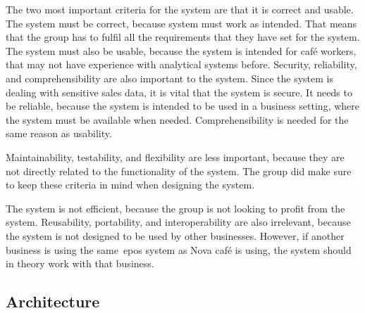 The two most important criteria for the system are that it is correct and usable.
The system must be correct, because system must work as intended.
That means that the group has to fulfil all the requirements that they have set for the system.
The system must also be usable, because the system is intended for café workers, that may not have experience with
analytical systems before.
Security, reliability, and comprehensibility are also important to the system.
Since the system is dealing with sensitive sales data, it is vital that the system is secure.
It needs to be reliable, because the system is intended to be used in a business setting, where the system must be 
available when needed.
Comprehensibility is needed for the same reason as usability.

Maintainability, testability, and flexibility are less important, because they are not directly related to the
functionality of the system.
The group did make sure to keep these criteria in mind when designing the system.

The system is not efficient, because the group is not looking to profit from the system.
Reusability, portability, and interoperability are also irrelevant, because the system is not designed to be used by
other businesses.
However, if another business is using the same~\acrshort{epos} system as Nova café is using, the system should in
theory work with that business.

\subsection{Architecture}\label{subsec:architecture}
